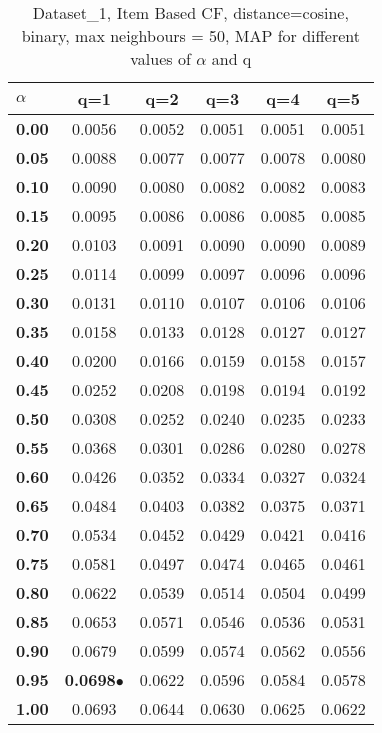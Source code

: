 \begin{table}
\begin{center}
\begin{tabular}{ | l || c | c | c | c | c |}
\hline
\textbf{$\alpha$} & \textbf{q=1} & \textbf{q=2} & \textbf{q=3} & \textbf{q=4} & \textbf{q=5} \\
\hline
\textbf{0.00} & 0.0056 & 0.0052 & 0.0051 & 0.0051 & 0.0051\\
\hline
\textbf{0.05} & 0.0088 & 0.0077 & 0.0077 & 0.0078 & 0.0080\\
\hline
\textbf{0.10} & 0.0090 & 0.0080 & 0.0082 & 0.0082 & 0.0083\\
\hline
\textbf{0.15} & 0.0095 & 0.0086 & 0.0086 & 0.0085 & 0.0085\\
\hline
\textbf{0.20} & 0.0103 & 0.0091 & 0.0090 & 0.0090 & 0.0089\\
\hline
\textbf{0.25} & 0.0114 & 0.0099 & 0.0097 & 0.0096 & 0.0096\\
\hline
\textbf{0.30} & 0.0131 & 0.0110 & 0.0107 & 0.0106 & 0.0106\\
\hline
\textbf{0.35} & 0.0158 & 0.0133 & 0.0128 & 0.0127 & 0.0127\\
\hline
\textbf{0.40} & 0.0200 & 0.0166 & 0.0159 & 0.0158 & 0.0157\\
\hline
\textbf{0.45} & 0.0252 & 0.0208 & 0.0198 & 0.0194 & 0.0192\\
\hline
\textbf{0.50} & 0.0308 & 0.0252 & 0.0240 & 0.0235 & 0.0233\\
\hline
\textbf{0.55} & 0.0368 & 0.0301 & 0.0286 & 0.0280 & 0.0278\\
\hline
\textbf{0.60} & 0.0426 & 0.0352 & 0.0334 & 0.0327 & 0.0324\\
\hline
\textbf{0.65} & 0.0484 & 0.0403 & 0.0382 & 0.0375 & 0.0371\\
\hline
\textbf{0.70} & 0.0534 & 0.0452 & 0.0429 & 0.0421 & 0.0416\\
\hline
\textbf{0.75} & 0.0581 & 0.0497 & 0.0474 & 0.0465 & 0.0461\\
\hline
\textbf{0.80} & 0.0622 & 0.0539 & 0.0514 & 0.0504 & 0.0499\\
\hline
\textbf{0.85} & 0.0653 & 0.0571 & 0.0546 & 0.0536 & 0.0531\\
\hline
\textbf{0.90} & 0.0679 & 0.0599 & 0.0574 & 0.0562 & 0.0556\\
\hline
\textbf{0.95} & \textbf{0.0698}$\bullet$ & 0.0622 & 0.0596 & 0.0584 & 0.0578\\
\hline
\textbf{1.00} & 0.0693 & 0.0644 & 0.0630 & 0.0625 & 0.0622\\
\hline
\end{tabular}
\caption{Dataset\_1, Item Based CF, distance=cosine, binary, max neighbours = 50, MAP for different values of $\alpha$ and q}
\label{table:MAP_Dataset_1_icf_cosine_binary_mnn=50}
\end{center}
\end{table}
